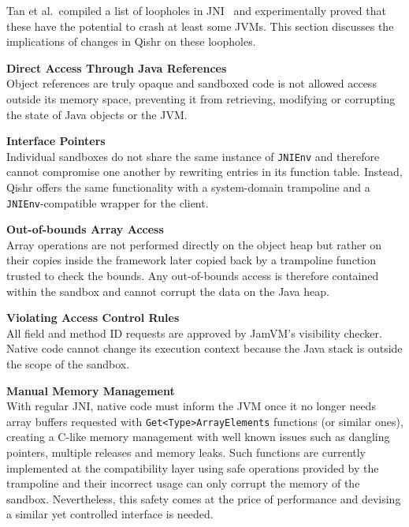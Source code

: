 \documentclass[a4paper,12pt,twoside,openright]{report}
\begin{document}
Tan et al.\ compiled a list of loopholes in JNI~\cite{Tan06safejava} and experimentally proved that these have the potential to crash at least some JVMs. This section discusses the implications of changes in Qishr on these loopholes.

\begin{description}
\item{\bf Direct Access Through Java References} \\
Object references are truly opaque and sandboxed code is not allowed access outside its memory space, preventing it from retrieving, modifying or corrupting the state of Java objects or the JVM.

\item{\bf Interface Pointers} \\
Individual sandboxes do not share the same instance of \texttt{JNIEnv} and therefore cannot compromise one another by rewriting entries in its function table. Instead, Qishr offers the same functionality with a system-domain trampoline and a \texttt{JNIEnv}-compatible wrapper for the client.

\item{\bf Out-of-bounds Array Access} \\
Array operations are not performed directly on the object heap but rather on their copies inside the framework later copied back by a trampoline function trusted to check the bounds. Any out-of-bounds access is therefore contained within the sandbox and cannot corrupt the data on the Java heap.

\item{\bf Violating Access Control Rules} \\
All field and method ID requests are approved by JamVM's visibility checker. Native code cannot change its execution context because the Java stack is outside the scope of the sandbox.

\item{\bf Manual Memory Management} \\
With regular JNI, native code must inform the JVM once it no longer needs array buffers requested with \texttt{Get\-<Type>\-Array\-Elements} functions (or similar ones), creating a C-like memory management with well known issues such as dangling pointers, multiple releases and memory leaks. Such functions are currently implemented at the compatibility layer using safe operations provided by the trampoline and their incorrect usage can only corrupt the memory of the sandbox. Nevertheless, this safety comes at the price of performance and devising a similar yet controlled interface is needed.


\end{description}
\end{document}
